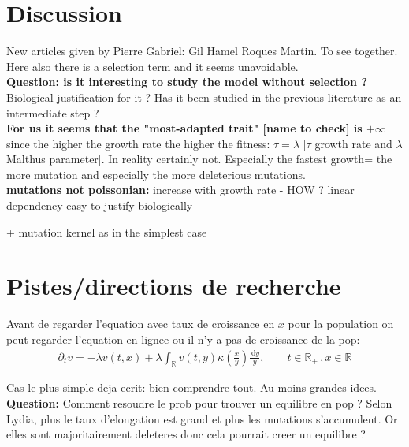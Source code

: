 \documentclass{article}
\newcommand{\p}{\partial}
\newcommand{\diff}{\,\mathrm{d}}
\newcommand{\RR}{\mathbb{R}}
\begin{document}
\section{Discussion}

New articles given by Pierre Gabriel: Gil Hamel Roques Martin. To see together. Here also there is a selection term and it seems unavoidable. \\

\textbf{Question: is it interesting to study the model without selection ?} Biological justification for it ? Has it been studied in the previous literature as an intermediate step ? \\

\textbf{For us it seems that the "most-adapted trait" [name to check] is $+\infty$} since the higher the growth rate the higher the fitness: $\tau=\lambda$ [$\tau$ growth rate and $\lambda$ Malthus parameter]. In reality certainly not. Especially the fastest growth= the more mutation and especially the more deleterious mutations.\\

\textbf{mutations not poissonian:} increase with growth rate - HOW ? linear dependency easy to justify biologically

+ mutation kernel as in the simplest case


\section{Pistes/directions de recherche}


Avant de regarder l'equation avec taux de croissance en $x$ pour la population on peut regarder l'equation en lignee ou il n'y a pas de croissance de la pop:
\begin{align}
    \p_t v =  - \lambda v(t,x)+ \lambda \int_\RR v(t,y)\kappa\left(\frac{x}{y}\right) \frac{\diff y}{y}, \qquad t \in \RR_+ \,, x \in \RR
    \label{eq:mod_simple}
\end{align}

Cas le plus simple deja ecrit: bien comprendre tout. Au moins grandes idees.\\

\noindent\textbf{Question:} Comment resoudre le prob pour trouver un equilibre en pop ? Selon Lydia, plus le taux d'elongation est grand et plus les mutations s'accumulent. Or elles sont majoritairement deleteres donc cela pourrait creer un equilibre ?
\end{document}
